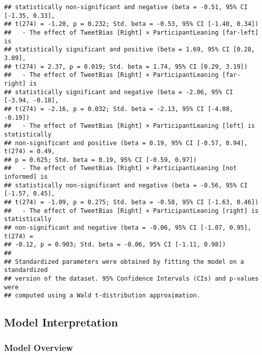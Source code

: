 \documentclass[
]{article}
\begin{document}
\begin{verbatim}
## statistically non-significant and negative (beta = -0.51, 95% CI [-1.35, 0.33],
## t(274) = -1.20, p = 0.232; Std. beta = -0.53, 95% CI [-1.40, 0.34])
##   - The effect of TweetBias [Right] × ParticipantLeaning [far-left] is
## statistically significant and positive (beta = 1.69, 95% CI [0.28, 3.09],
## t(274) = 2.37, p = 0.019; Std. beta = 1.74, 95% CI [0.29, 3.19])
##   - The effect of TweetBias [Right] × ParticipantLeaning [far-right] is
## statistically significant and negative (beta = -2.06, 95% CI [-3.94, -0.18],
## t(274) = -2.16, p = 0.032; Std. beta = -2.13, 95% CI [-4.08, -0.19])
##   - The effect of TweetBias [Right] × ParticipantLeaning [left] is statistically
## non-significant and positive (beta = 0.19, 95% CI [-0.57, 0.94], t(274) = 0.49,
## p = 0.625; Std. beta = 0.19, 95% CI [-0.59, 0.97])
##   - The effect of TweetBias [Right] × ParticipantLeaning [not informed] is
## statistically non-significant and negative (beta = -0.56, 95% CI [-1.57, 0.45],
## t(274) = -1.09, p = 0.275; Std. beta = -0.58, 95% CI [-1.63, 0.46])
##   - The effect of TweetBias [Right] × ParticipantLeaning [right] is statistically
## non-significant and negative (beta = -0.06, 95% CI [-1.07, 0.95], t(274) =
## -0.12, p = 0.903; Std. beta = -0.06, 95% CI [-1.11, 0.98])
## 
## Standardized parameters were obtained by fitting the model on a standardized
## version of the dataset. 95% Confidence Intervals (CIs) and p-values were
## computed using a Wald t-distribution approximation.
\end{verbatim}

\subsection{\texorpdfstring{\textbf{Model
Interpretation}}{Model Interpretation}}\label{model-interpretation-4}

\subsubsection{\texorpdfstring{\textbf{Model
Overview}}{Model Overview}}\label{model-overview-4}
\end{document}
